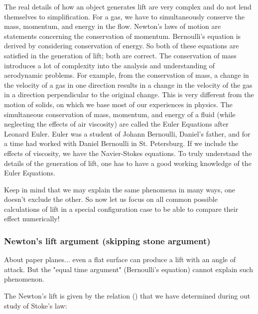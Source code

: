 	The real details of how an object generates lift are very complex and do not lend themselves to simplification. For a gas, we have to simultaneously conserve the mass, momentum, and energy in the flow. Newton's laws of motion are statements concerning the conservation of momentum. Bernoulli's equation is derived by considering conservation of energy. So both of these equations are satisfied in the generation of lift; both are correct. The conservation of mass introduces a lot of complexity into the analysis and understanding of aerodynamic problems. For example, from the conservation of mass, a change in the velocity of a gas in one direction results in a change in the velocity of the gas in a direction perpendicular to the original change. This is very different from the motion of solids, on which we base most of our experiences in physics. The simultaneous conservation of mass, momentum, and energy of a fluid (while neglecting the effects of air viscosity) are called the Euler Equations after Leonard Euler. Euler was a student of Johann Bernoulli, Daniel's father, and for a time had worked with Daniel Bernoulli in St. Petersburg. If we include the effects of viscosity, we have the Navier-Stokes equations. To truly understand the details of the generation of lift, one has to have a good working knowledge of the Euler Equations.
	
	Keep in mind that we may explain the same phenomena in many ways, one doesn't exclude the other. So now let us focus on all common possible calculations of lift in a special configuration case to be able to compare their effect numerically!
	
	\subsubsection{Newton's lift argument (skipping stone argument)}
	About paper planes... even a flat surface can produce a lift with an angle of attack. But the "equal time argument" (Bernoulli's equation) cannot explain such phenomenon.
	
	The Newton's lift is given by the relation () that we have determined during out study of Stoke's law:
	
